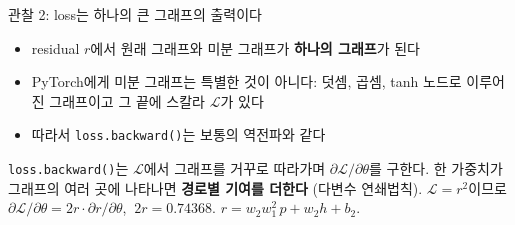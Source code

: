 \documentclass[aspectratio=169,11pt]{beamer}
\newcommand{\loss}{\mathcal{L}}
\begin{document}
\begin{frame}{관찰 2: loss는 하나의 큰 그래프의 출력이다}
\begin{keybox}[관찰 2]
\begin{itemize}
\item residual $r$에서 원래 그래프와 미분 그래프가 \textbf{하나의 그래프}가 된다
\item PyTorch에게 미분 그래프는 특별한 것이 아니다: 덧셈, 곱셈, tanh 노드로 이루어진 그래프이고 그 끝에 스칼라 $\loss$가 있다
\item 따라서 \texttt{loss.backward()}는 보통의 역전파와 같다
\end{itemize}
\end{keybox}
\vskip3mm
\texttt{loss.backward()}는 $\loss$에서 그래프를 거꾸로 따라가며 $\partial\loss/\partial\theta$를 구한다.
한 가중치가 그래프의 여러 곳에 나타나면 \textbf{경로별 기여를 더한다} (다변수 연쇄법칙).
\vskip2mm
$\loss=r^2$이므로 $\partial\loss/\partial\theta=2r\cdot\partial r/\partial\theta$, $\ 2r=0.74368$.\quad
$r=w_2w_1^2\,p+w_2h+b_2$.
\end{frame}
\end{document}
